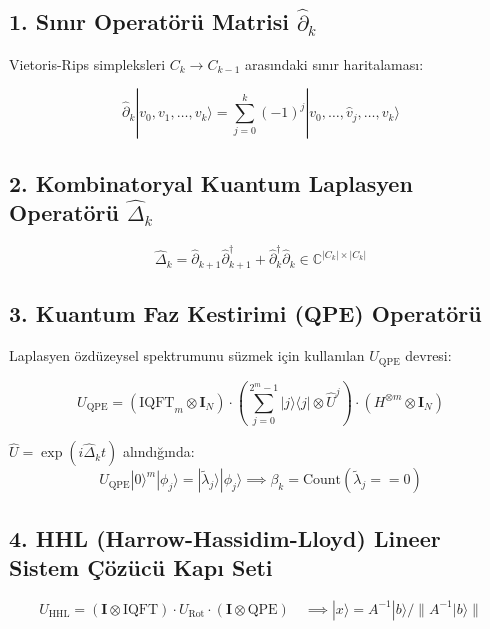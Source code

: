 \documentclass[11pt, a4paper]{article}
\begin{document}
\subsection{1. Sınır Operatörü Matrisi $\hat{\partial}_k$}
Vietoris-Rips simpleksleri $C_k \to C_{k-1}$ arasındaki sınır haritalaması:

\begin{equation}
\hat{\partial}_k |v_0, v_1, \dots, v_k\rangle = \sum_{j=0}^k (-1)^j |v_0, \dots, \hat{v}_j, \dots, v_k\rangle
\end{equation}

\subsection{2. Kombinatoryal Kuantum Laplasyen Operatörü $\hat{\Delta}_k$}
\begin{equation}
\hat{\Delta}_k = \hat{\partial}_{k+1} \hat{\partial}_{k+1}^\dagger + \hat{\partial}_k^\dagger \hat{\partial}_k \in \mathbb{C}^{|C_k| \times |C_k|}
\end{equation}

\subsection{3. Kuantum Faz Kestirimi (QPE) Operatörü}
Laplasyen özdüzeysel spektrumunu süzmek için kullanılan $U_{\text{QPE}}$ devresi:

\begin{equation}
U_{\text{QPE}} = (\text{IQFT}_m \otimes \mathbf{I}_N) \cdot \left( \sum_{j=0}^{2^m-1} |j\rangle\langle j| \otimes \hat{U}^j \right) \cdot (H^{\otimes m} \otimes \mathbf{I}_N)
\end{equation}

$\hat{U} = \exp(i \hat{\Delta}_k t)$ alındığında:
\begin{equation}
U_{\text{QPE}} |0\rangle^m |\phi_j\rangle = |\tilde{\lambda}_j\rangle |\phi_j\rangle \implies \beta_k = \text{Count}(\tilde{\lambda}_j == 0)
\end{equation}

\subsection{4. HHL (Harrow-Hassidim-Lloyd) Lineer Sistem Çözücü Kapı Seti}
\begin{equation}
U_{\text{HHL}} = (\mathbf{I} \otimes \text{IQFT}) \cdot U_{\text{Rot}} \cdot (\mathbf{I} \otimes \text{QPE}) \quad \implies |x\rangle = A^{-1}|b\rangle / \|A^{-1}|b\rangle\|
\end{equation}
\end{document}
